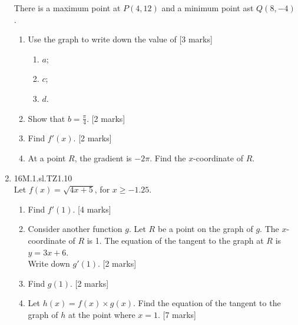 \documentclass[12pt, twoside]{article}
\begin{document}
\begin{enumerate}
\begin{center}
      \end{center}
      There is a maximum point at $P(4,12)$ and a minimum point ast $Q(8, -4)$.
      \begin{enumerate}
        \item Use the graph to write down the value of [3 marks]
          \begin{enumerate}
            \item $a$;
            \item $c$;
            \item $d$.
          \end{enumerate}
        \item Show that $b= \frac{\pi}{4}$. [2 marks]
        \item Find $f'(x)$. [2 marks]
        \item At a point $R$, the gradient is $-2 \pi$. Find the $x$-coordinate of $R$.
      \end{enumerate}

    \item 16M.1.sl.TZ1.10\\
    Let $f(x)=\sqrt{4x+5}$, for $x \geq -1.25$.
    \begin{enumerate}
      \item Find $f'(1)$. [4 marks]
      \item Consider another function $g$. Let $R$ be a point on the graph of $g$. The $x$-coordinate of $R$ is 1. The equation of the tangent to the graph at $R$ is  $y=3x+6$.\\
      Write down $g'(1)$. [2 marks]
      \item Find $g(1)$. [2 marks]
      \item Let $h(x)=f(x) \times g(x)$. Find the equation of the tangent to the graph of $h$ at the point where $x=1$. [7 marks]
    \end{enumerate}

\end{enumerate}
\end{document}
